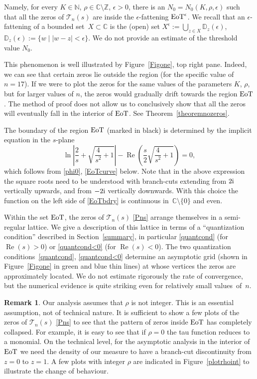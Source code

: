 \documentclass[10pt,a4paper]{amsart}
\numberwithin{equation}{section}
\theoremstyle{definition}
\newtheorem{Remark}[Theorem]{Remark}
\def \DD{\mathbb D}
\def\le{\left}
\def\ri{\right}
\def\be{\begin{equation}}
\def\ee{\end{equation}}
\def\C{{\mathbb C}}
\def\Z{{\mathbb Z}}
\def\N{{\mathbb N}}
\def \Re{\operatorname{Re} }
\def\la{\label}
\begin{document}
Namely, for every $K\in \N$, $ \rho\in \C\setminus \Z$, $\epsilon>0$, there is an $N_0= N_0(K, \rho, \epsilon)$ such that all the zeros of $\mathcal T_n(s)$ are inside the $\epsilon$-fattening ${\rm EoT}^\epsilon$. We recall that an $\epsilon$-fattening of a bounded set~${X\subset \C}$ is the (open) set
$
X^\epsilon:= \bigcup_{z\in X} \DD_z(\epsilon )$, $ \DD_z(\epsilon):=\{w\mid |w-z|<\epsilon\}$.
We do not provide an estimate of the threshold value $N_0$.

This phenomenon is well illustrated by Figure~\ref{Figone}, top right pane. Indeed, we can see that certain zeros lie outside the region (for the specific value of $n=17$). If we were to plot the zeros for the same values of the parameters ${K}$, ${\rho}$, but for larger values of $n$, the zeros would gradually drift towards the region ${\rm EoT}$. The method of proof does not allow us to conclusively show that all the zeros will eventually fall in the interior of ${\rm EoT}$. See Theorem~\ref{theoremnozeros}.

 The boundary of the region ${\rm EoT}$ (marked in black) is determined by the implicit equation in the $s$-plane
\be
\label{EoTbdry}
 \ln\le|\frac {2}{s} + \sqrt{\frac {4}{s^2}+1}\ri| - \Re\le(\frac s 2\sqrt{ \frac {4}{s^2} + 1} \ri)=0,
\ee
which follows from \eqref{phi0}, \eqref{EoTcurve} below. Note that in the above expression the square roots need to be understood with branch-cuts extending from $2{\rm i}$ vertically upwards, and from $-2{\rm i}$ vertically downwards. With this choice the function on the left side of \eqref{EoTbdry} is continuous in~${\C\setminus\{0\}}$ and even.

Within the set ${\rm EoT}$, the zeros of $\mathcal T_n(s)$ \eqref{Pns} arrange themselves in a semi-regular lattice. We give a description of this lattice in terms of a ``quantization condition'' described in Section~\ref{summary}, in particular \eqref{quantcond} (for $\Re (s)>0$) or \eqref{quantcond<0} (for $\Re (s)<0$). The two quantization conditions~\eqref{quantcond}, \eqref{quantcond<0} determine an asymptotic grid (shown in Figure~\ref{Figone} in green and blue thin lines) at whose vertices the zeros are approximately located. We do not estimate rigorously the rate of convergence, but the numerical evidence is quite striking even for relatively small values~of~$n$.

\begin{Remark}\la{rhoint}
Our analysis assumes that $\rho$ is not integer. This is an essential assumption, not of technical nature. It is sufficient to show a few plots of the zeros of $\mathcal T_n(s)$ \eqref{Pns} to see that the pattern of zeros inside ${\rm EoT}$ has completely collapsed. For example, it is easy to see that if $\rho=0$ the tau function reduces to a monomial. On the technical level, for the asymptotic analysis in the interior of ${\rm EoT}$ we need the density of our measure to have a branch-cut discontinuity from~${z=0}$ to $z=1$. A few plots with integer $\rho$ are indicated in Figure~\ref{plotrhoint} to illustrate the change of behaviour.
\end{Remark}
\end{document}
